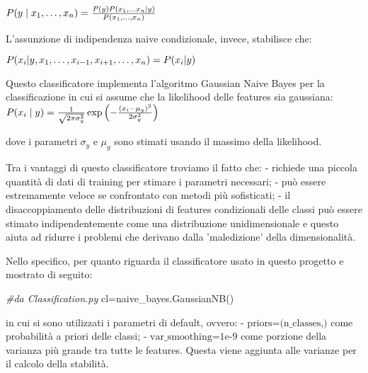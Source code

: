 \documentclass[11pt]{article}
\newenvironment{Shaded}{}{}
\newcommand{\CommentTok}[1]{\textcolor[rgb]{0.38,0.63,0.69}{\textit{{#1}}}}
\newcommand{\NormalTok}[1]{{#1}}
\newcommand{\OperatorTok}[1]{\textcolor[rgb]{0.40,0.40,0.40}{{#1}}}
\begin{document}
\(\begin{equation*} P(y \mid x_1, \dots, x_n) = \frac{P(y) P(x_1, \dots x_n \mid y)} {P(x_1, \dots, x_n)} \\ \end{equation*}\)

L'assunzione di indipendenza naive condizionale, invece, stabilisce che:

\(\begin{equation*} P(x_i | y, x_1, \dots, x_{i-1}, x_{i+1}, \dots, x_n) = P(x_i | y) \\ \end{equation*}\)

Questo classificatore implementa l'algoritmo Gaussian Naive Bayes per la
classificazione in cui si assume che la likelihood delle features sia
gaussiana:
\(\begin{equation*} P(x_i \mid y) = \frac{1}{\sqrt{2\pi\sigma^2_y}} \exp\left(-\frac{(x_i - \mu_y)^2}{2\sigma^2_y}\right) \\ \end{equation*}\)

dove i parametri \(\sigma_y\) e \(\mu_y\) sono stimati usando il massimo
della likelihood.

Tra i vantaggi di questo classificatore troviamo il fatto che: -
richiede una piccola quantità di dati di training per stimare i
parametri necessari; - può essere estremamente veloce se confrontato con
metodi più sofisticati; - il disaccoppiamento delle distribuzioni di
features condizionali delle classi può essere stimato indipendentemente
come una distribuzione unidimensionale e questo aiuta ad ridurre i
problemi che derivano dalla 'maledizione' della dimensionalità.

Nello specifico, per quanto riguarda il classificatore usato in questo
progetto e mostrato di seguito:

\begin{Shaded}
\begin{Highlighting}[]
\CommentTok{#da Classification.py}
\NormalTok{cl}\OperatorTok{=}\NormalTok{naive_bayes.GaussianNB()    }
\end{Highlighting}
\end{Shaded}

in cui si sono utilizzati i parametri di default, ovvero: -
\(\text{priors=(n_classes,)}\) come probabilità a priori delle classi; -
\(\text{var_smoothing=1e-9}\) come porzione della varianza più grande
tra tutte le features. Questa viene aggiunta alle varianze per il
calcolo della stabilità.
\end{document}
